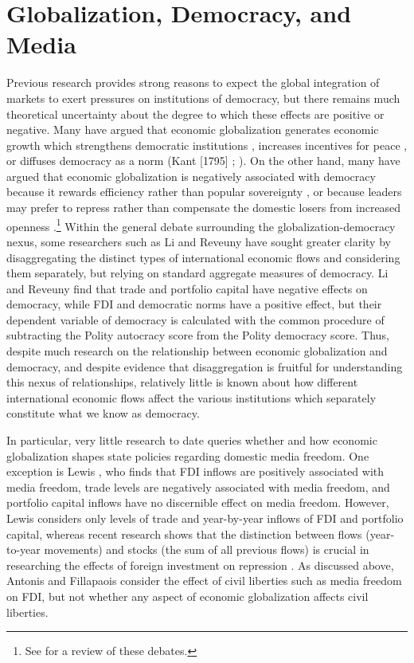 \documentclass[12pt,a4paper]{article}\usepackage[]{graphicx}\usepackage[]{color}
\begin{document}
\section{Globalization, Democracy, and Media}

Previous research provides strong reasons to expect the global integration of markets to exert pressures on institutions of democracy, but there remains much theoretical uncertainty about the degree to which these effects are positive or negative. Many have argued that economic globalization generates economic growth which strengthens democratic institutions \parencites{Baghwati:1997vy}{Im:1996cl}, increases incentives for peace \parencites{Baghwati:1997vy}{Oneal:1999fc}, or diffuses democracy as a norm (Kant [1795] \cite*{Kant:1983uf}; \cite{Limongi:1996dr}). On the other hand, many have argued that economic globalization is negatively associated with democracy because it rewards efficiency rather than popular sovereignty \parencites{Huntington:1975vt}{Lindblom:1977ue}{Cammack:1998gf}, or because leaders may prefer to repress rather than compensate the domestic losers from increased openness \parencite{Adsera:2002vt}.\footnote{See \cite{Milner:2009hi} for a review of these debates.} Within the general debate surrounding the globalization-democracy nexus, some researchers such as Li and Reveuny \parencite*{Li:2003vj} have sought greater clarity by disaggregating the distinct types of international economic flows and considering them separately, but relying on standard aggregate measures of democracy. Li and Reveuny find that trade and portfolio capital have negative effects on democracy, while FDI and democratic norms have a positive effect, but their dependent variable of democracy is calculated with the common procedure of subtracting the Polity autocracy score from the Polity democracy score. Thus, despite much research on the relationship between economic globalization and democracy, and despite evidence that disaggregation is fruitful for understanding this nexus of relationships, relatively little is known about how different international economic flows affect the various institutions which separately constitute what we know as democracy.

In particular, very little research to date queries whether and how economic globalization shapes state policies regarding domestic media freedom. One exception is Lewis \parencite*{Lewis:qDvYbWlU}, who finds that FDI inflows are positively associated with media freedom, trade levels are negatively associated with media freedom, and portfolio capital inflows have no discernible effect on media freedom. However, Lewis considers only levels of trade and year-by-year inflows of FDI and portfolio capital, whereas recent research shows that the distinction between flows (year-to-year movements) and stocks (the sum of all previous flows) is crucial in researching the effects of foreign investment on repression \parencite{Sorens:2012hc}. As discussed above, Antonis and Fillapaois \parencite*{Adam:2007gn} consider the effect of civil liberties such as media freedom on FDI, but not whether any aspect of economic globalization affects civil liberties.
\end{document}

